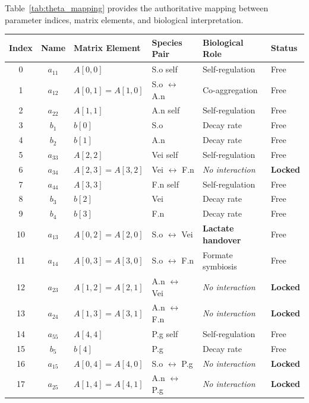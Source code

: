 \documentclass[11pt,a4paper]{article}
\begin{document}
Table~\ref{tab:theta_mapping} provides the authoritative mapping between parameter indices, matrix elements, and biological interpretation.

\begin{table}[h]
\centering
\small
\begin{tabular}{ccllll}
\toprule
\textbf{Index} & \textbf{Name} & \textbf{Matrix Element} & \textbf{Species Pair} & \textbf{Biological Role} & \textbf{Status} \\
\midrule
0 & $a_{11}$ & $A[0,0]$ & S.o self & Self-regulation & Free \\
1 & $a_{12}$ & $A[0,1]=A[1,0]$ & S.o $\leftrightarrow$ A.n & Co-aggregation & Free \\
2 & $a_{22}$ & $A[1,1]$ & A.n self & Self-regulation & Free \\
3 & $b_1$ & $b[0]$ & S.o & Decay rate & Free \\
4 & $b_2$ & $b[1]$ & A.n & Decay rate & Free \\
\midrule
5 & $a_{33}$ & $A[2,2]$ & Vei self & Self-regulation & Free \\
\rowcolor{red!15}
6 & $a_{34}$ & $A[2,3]=A[3,2]$ & Vei $\leftrightarrow$ F.n & \textit{No interaction} & \textbf{Locked} \\
7 & $a_{44}$ & $A[3,3]$ & F.n self & Self-regulation & Free \\
8 & $b_3$ & $b[2]$ & Vei & Decay rate & Free \\
9 & $b_4$ & $b[3]$ & F.n & Decay rate & Free \\
\midrule
10 & $a_{13}$ & $A[0,2]=A[2,0]$ & S.o $\leftrightarrow$ Vei & \textbf{Lactate handover} & Free \\
11 & $a_{14}$ & $A[0,3]=A[3,0]$ & S.o $\leftrightarrow$ F.n & Formate symbiosis & Free \\
\rowcolor{red!15}
12 & $a_{23}$ & $A[1,2]=A[2,1]$ & A.n $\leftrightarrow$ Vei & \textit{No interaction} & \textbf{Locked} \\
\rowcolor{red!15}
13 & $a_{24}$ & $A[1,3]=A[3,1]$ & A.n $\leftrightarrow$ F.n & \textit{No interaction} & \textbf{Locked} \\
\midrule
14 & $a_{55}$ & $A[4,4]$ & P.g self & Self-regulation & Free \\
15 & $b_5$ & $b[4]$ & P.g & Decay rate & Free \\
\midrule
\rowcolor{red!15}
16 & $a_{15}$ & $A[0,4]=A[4,0]$ & S.o $\leftrightarrow$ P.g & \textit{No interaction} & \textbf{Locked} \\
\rowcolor{red!15}
17 & $a_{25}$ & $A[1,4]=A[4,1]$ & A.n $\leftrightarrow$ P.g & \textit{No interaction} & \textbf{Locked} \\

\end{tabular}
\end{table}
\end{document}
